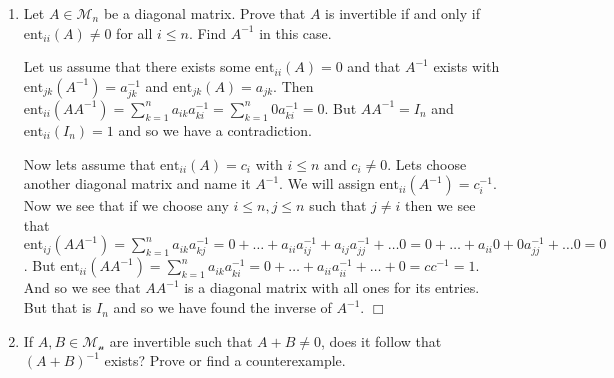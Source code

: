 \documentclass[letterpaper]{article}
\begin{document}
\begin{enumerate}
\begin{enumerate}
\begin{align*}
    +\left[\begin{array}{ccc}0&0&3\\3&0&6\\0&3&-9\end{array}\right]
    +\left[\begin{array}{ccc}-2&0&0\\0&-2&0\\0&0&-2\end{array}\right]
    \right)A&=I_3\\
    \left[\begin{array}{ccc}-2&1&0\\3&0&1\\1&0&0\end{array}\right]
    \left[\begin{array}{ccc}0&0&1\\1&0&2\\0&1&-3\end{array}\right]&=I_3\\
    \left[\begin{array}{ccc}1&0&0\\0&1&0\\0&0&1\end{array}\right]&=I_3
  \end{align*}
  \item
  Use part (a) to see that $A$ is invertible and compute $A^{-1}$
  
  Obviously $A^{-1}=A^2+3A-2I_3=\left[\begin{array}{ccc}-2&1&0\\3&0&1\\1&0&0\end{array}\right]$
  \end{enumerate}
\item
Let $A\in \mathcal{M}_n$ be a diagonal matrix. Prove that $A$ is invertible if and only if $\text{ent}_{ii}(A)\ne0$ for all $i\le n$. Find $A^{-1}$ in this case.

Let us assume that there exists some $\text{ent}_{ii}(A)=0$ and that $A^{-1}$ exists with $\text{ent}_{jk}(A^{-1})=a_{jk}^{-1}$ and $\text{ent}_{jk}(A)=a_{jk}$. Then $\text{ent}_{ii}(AA^{-1})=\sum\limits_{k=1}^n{a_{ik}a_{ki}^{-1}}=\sum\limits_{k=1}^n{0a_{ki}^{-1}}=0$. But $AA^{-1}=I_n$ and $\text{ent}_{ii}(I_n)=1$ and so we have a contradiction.

Now lets assume that $\text{ent}_{ii}(A)=c_i$ with $i\le n$ and $c_i\ne 0$. Lets choose another diagonal matrix and name it $A^{-1}$. We will assign $\text{ent}_{ii}(A^{-1})=c_{i}^{-1}$. Now we see that if we choose any $i\le n,j\le n$ such that $j\ne i$ then we see that $\text{ent}_{ij}(AA^{-1})=\sum\limits_{k=1}^n{a_{ik}a_{kj}^{-1}}=0+\dots+a_{ii}a_{ij}^{-1}+a_{ij}a_{jj}^{-1}+\dots0=0+\dots+a_{ii}0+0a_{jj}^{-1}+\dots0=0$.
But $\text{ent}_{ii}(AA^{-1})=\sum\limits_{k=1}^n{a_{ik}a_{ki}^{-1}}=0+\dots+a_{ii}a_{ii}^{-1}+\dots+0=cc^{-1}=1$. And so we see that $AA^{-1}$ is a diagonal matrix with all ones for its entries. But that is $I_n$ and so we have found the inverse of $A^{-1}$.
$\Box$
\item
If $A,B\in \mathcal{M_n}$ are invertible such that $A+B\ne 0$, does it follow that $(A+B)^{-1}$ exists? Prove or find a counterexample.


\end{enumerate}
\end{document}
